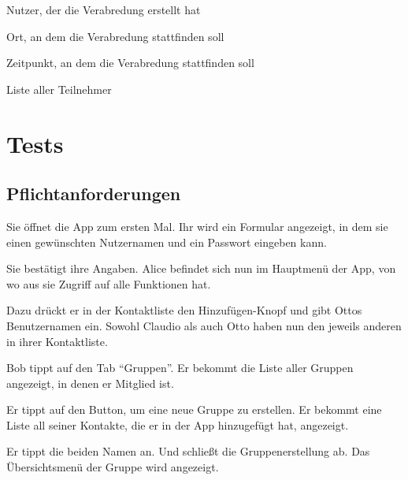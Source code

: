 \documentclass[parskip=full,11pt]{scrartcl}
\begin{document}
Nutzer, der die Verabredung erstellt hat

Ort, an dem die Verabredung stattfinden soll

Zeitpunkt, an dem die Verabredung stattfinden soll

Liste aller Teilnehmer

\pagebreak
\section{Tests}
\subsection{Pflichtanforderungen}

{Sie öffnet die App zum ersten Mal.}
{Ihr wird ein Formular angezeigt, in dem sie einen gewünschten Nutzernamen
und ein Passwort eingeben kann.}

{Sie bestätigt ihre Angaben.}
{Alice befindet sich nun im Hauptmenü der App, von wo aus sie Zugriff auf alle Funktionen hat.}

{Dazu drückt er in der Kontaktliste den Hinzufügen-Knopf und gibt Ottos Benutzernamen ein.}
{Sowohl Claudio als auch Otto haben nun den jeweils anderen in ihrer Kontaktliste.}


{Bob tippt auf den Tab  \enquote{Gruppen}.}
{Er bekommt die Liste aller Gruppen angezeigt, in denen er Mitglied ist.}

{Er tippt auf den Button, um eine neue Gruppe zu erstellen.}
{Er bekommt eine Liste all seiner Kontakte, die er in der App hinzugefügt hat, angezeigt.}

{Er tippt die beiden Namen an. Und schließt die Gruppenerstellung ab.}
{Das Übersichtsmenü der Gruppe wird angezeigt.}
\end{document}
